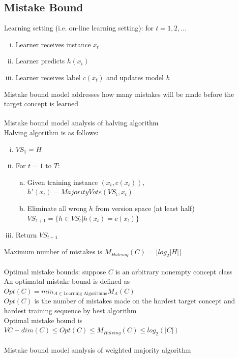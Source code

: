 \documentclass{article}
\begin{document}
		\subsection{Mistake Bound}
			Learning setting (i.e. on-line learning setting): for $t = 1, 2, ...$
			\begin{enumerate}[(i)]
				\item Learner receives instance $x_t$
				\item Learner predicts $h(x_t)$
				\item Learner receives label $c(x_t)$ and updates model $h$
				\end{enumerate}
			Mistake bound model addresses how many mistakes will be made before the target concept is learned \\
			\\
			Mistake bound model analysis of halving algorithm \\
			Halving algorithm is as follows:
			\begin{enumerate}[(i)]
				\item $VS_1 = H$
				\item For $t = 1$ to $T$:
				\begin{enumerate}[(a)]
					\item Given training instance $(x_t, c(x_t))$, $h'(x_t) = MajorityVote(VS_t, x_t)$
					\item Eliminate all wrong $h$ from version space (at least half) \\
					$VS_{t + 1} = \{h \in VS_t | h(x_t) = c(x_t)\}$
					\end{enumerate}
				\item Return $VS_{t + 1}$
				\end{enumerate}
			Maximum number of mistakes is $M_{Halving}(C) = \lfloor log_2|H|\rfloor$ \\
			\\
			Optimal mistake bounds: suppose $C$ is an arbitrary nonempty concept class \\
			An optimatal mistake bound is defined as $Opt(C) = min_{A \in \text{Learning Algorithms}} M_A(C)$ \\
			$Opt(C)$ is the number of mistakes made on the hardest target concept and hardest training sequence by best algorithm \\
			Optimal mistake bound is $VC-dim(C) \leq Opt(C) \leq M_{Halving}(C) \leq log_2(|C|)$ \\
			\\
			Mistake bound model analysis of weighted majority algorithm \\
\end{document}
